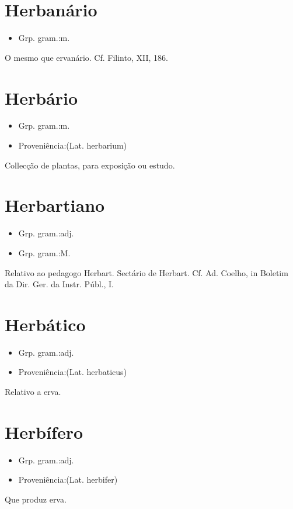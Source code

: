 \documentclass{article}
\begin{document}
\section{Herbanário}
\begin{itemize}
\item {Grp. gram.:m.}
\end{itemize}
O mesmo que \textunderscore ervanário\textunderscore . Cf. Filinto, XII, 186.
\section{Herbário}
\begin{itemize}
\item {Grp. gram.:m.}
\end{itemize}
\begin{itemize}
\item {Proveniência:(Lat. \textunderscore herbarium\textunderscore )}
\end{itemize}
Collecção de plantas, para exposição ou estudo.
\section{Herbartiano}
\begin{itemize}
\item {Grp. gram.:adj.}
\end{itemize}
\begin{itemize}
\item {Grp. gram.:M.}
\end{itemize}
Relativo ao pedagogo Herbart.
Sectário de Herbart. Cf. Ad. Coelho, in \textunderscore Boletim da Dir. Ger. da Instr. Públ.\textunderscore , I.
\section{Herbático}
\begin{itemize}
\item {Grp. gram.:adj.}
\end{itemize}
\begin{itemize}
\item {Proveniência:(Lat. \textunderscore herbaticus\textunderscore )}
\end{itemize}
Relativo a erva.
\section{Herbífero}
\begin{itemize}
\item {Grp. gram.:adj.}
\end{itemize}
\begin{itemize}
\item {Proveniência:(Lat. \textunderscore herbifer\textunderscore )}
\end{itemize}
Que produz erva.
\end{document}
